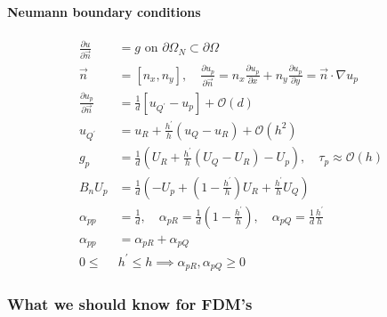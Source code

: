 \paragraph{Neumann boundary conditions}
\begin{align*}
  \frac{\partial u}{\partial \vec{n}}   & = g \text{ on } \partial\Omega_N \subset \partial\Omega                                                                                                                     \\
  \vec{n}                               & = \left[n_x, n_y\right], \quad \frac{\partial u_p}{\partial \vec{n}} = n_x \frac{\partial u_p}{\partial x} + n_y \frac{\partial u_p}{\partial y} = \vec{n} \cdot \nabla u_p \\
  \frac{\partial u_p}{\partial \vec{n}} & = \frac{1}{d}\left[u_{Q^\prime} - u_p\right] + \mathcal{O}(d)                                                                                                               \\
  u_{Q^\prime}                          & = u_R + \frac{h^\prime}{h}\left(u_Q - u_R\right) + \mathcal{O}(h^2)                                                                                                         \\
  g_p                                   & = \frac{1}{d}\left(U_R + \frac{h^\prime}{h}\left(U_Q - U_R\right) - U_p\right), \quad \tau_p \approx \mathcal{O}(h)                                                         \\
  B_n U_p                               & = \frac{1}{d}\left(-U_p + (1-\frac{h^\prime}{h})U_R + \frac{h^\prime}{h}U_Q\right)                                                                                          \\
  \alpha_{pp}                           & = \frac{1}{d}, \quad \alpha_{pR} = \frac{1}{d}\left(1-\frac{h^\prime}{h}\right), \quad \alpha_{pQ} = \frac{1}{d}\frac{h^\prime}{h}                                          \\
  \alpha_{pp}                           & = \alpha_{pR} + \alpha_{pQ}                                                                                                                                                 \\
  0 \le                                 & h^\prime \le h \implies \alpha_{pR}, \alpha_{pQ} \ge 0
\end{align*}

\subsubsection{What we should know for FDM's}

